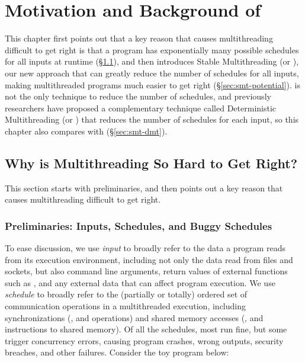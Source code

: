 \chapter{Motivation and Background of \smt}
\label{sec:smt-motivation}

This chapter first points out that a key reason that causes multithreading
difficult to get right is that a program has  exponentially many possible 
schedules for all inputs at runtime (\S\ref{sec:smt-why}), and then introduces 
Stable Multithreading (or \smt), our new approach that can greatly reduce the 
number of schedules for all inputs, making multithreaded programs much easier 
to get right (\S\ref{sec:smt-potential}). \smt is not the only technique to 
reduce the number of schedules, and previously researchers have proposed a 
complementary technique called Deterministic Multithreading (or \dmt) that 
reduces the number of schedules for each input, so this chapter also compares 
\smt with \dmt (\S\ref{sec:smt-dmt}).

\section{Why is Multithreading So Hard to Get Right?}
\label{sec:smt-why}



This section starts with preliminaries, and then points out a key reason that
causes multithreading difficult to get right.

\subsection{Preliminaries: Inputs, Schedules, and Buggy Schedules}

To ease discussion, we use \emph{input} to broadly refer to the data a
program reads from its execution environment, including not only the data
read from files and sockets, but also command line arguments, return
values of external functions such as , and any external data
that can affect program execution.  We use \emph{schedule} to broadly refer to
the (partially or totally) ordered set of communication operations in a
multithreaded execution, including synchronizations (\eg,  and
 operations) and shared memory accesses (\eg,  and
 instructions to shared memory). Of all the schedules, most run
fine, but some trigger concurrency errors, causing program crashes,
wrong outputs, security breaches, and other failures. Consider the toy program
below:


